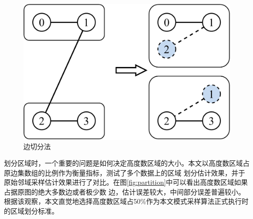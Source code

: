 \documentclass[master]{thesis-uestc}
\begin{document}
\begin{figure}
    \includegraphics[width=.5\linewidth]{pic/cut.pdf}
    \caption{边切分法}
\end{figure}

    划分区域时，一个重要的问题是如何决定高度数区域的大小。本文以高度数区域占原边集数组的比例作为衡量指标，测试了多个数据上的区域
划分估计效果，并于原始邻域采样估计效果进行了对比。在图\ref{fig:partition}中可以看出高度数区域如果占据原图的绝大多数边或者极少数
边，估计误差较大，中间部分误差普遍较小。根据该观察，本文直觉地选择高度数区域占50\%作为本文模式采样算法正式执行时的区域划分标准。
\end{document}
